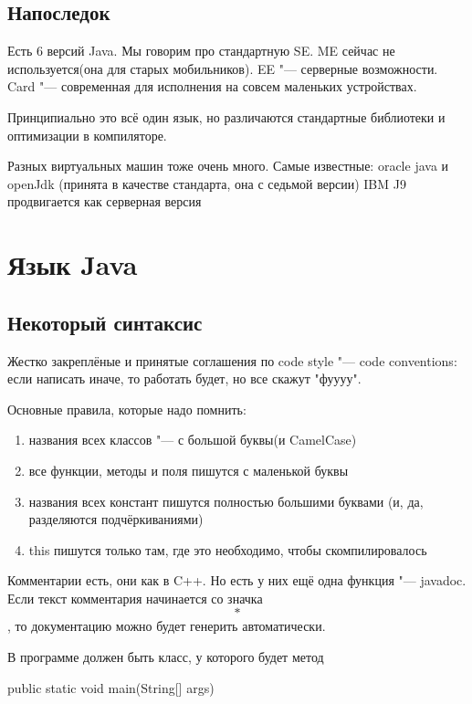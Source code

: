 \section{Напоследок}
	Есть 6 версий Java. Мы говорим про стандартную SE. 
	ME сейчас не используется(она для старых мобильников).
	EE "--- серверные возможности. 
	Card "--- современная для исполнения на совсем маленьких устройствах.
	
	Принципиально это всё один язык, но различаются стандартные 
	библиотеки и оптимизации в компиляторе.


	Разных виртуальных машин тоже очень много. 
	Самые известные: oracle java и openJdk
	(принята в качестве стандарта, она с седьмой версии)
	IBM J9 продвигается как серверная версия

	

\chapter{Язык Java}

\section{Некоторый синтаксис}

Жестко закреплёные и принятые соглашения по code style "--- 
code conventions: если написать иначе, то
работать будет, но все скажут "фуууу".

Основные правила, которые надо помнить:
\begin{enumerate}
	\item названия всех классов "--- с большой буквы(и CamelCase)
	
	\item все функции, методы и поля пишутся с маленькой буквы
	
	\item названия всех констант пишутся полностью большими буквами
		(и, да, разделяются подчёркиваниями)
	
	\item this пишутся только там, где это необходимо, 
		чтобы скомпилировалось
\end{enumerate}

Комментарии есть, они как в C++. Но есть у них ещё одна функция "---
javadoc. Если текст комментария начинается со значка \[*\], 
то документацию можно будет генерить автоматически.

В программе должен быть класс, у которого будет метод 

\begin{javacode}
public static void main(String[] args)
\end{javacode}

